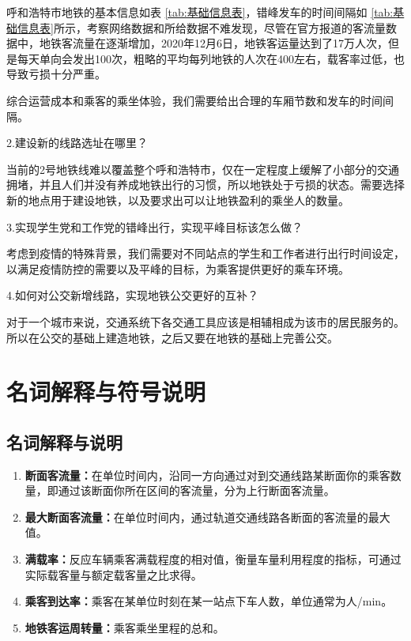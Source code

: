 \documentclass[12pt,a4paper]{mcmthesis}
\newcommand\wordc[1]{\textbf{#1}}
\begin{document}
    呼和浩特市地铁的基本信息如表 \ref{tab:基础信息表}，错峰发车的时间间隔如 \ref{tab:基础信息表}所示，考察网络数据和所给数据不难发现，尽管在官方报道的客流量数据中，地铁客流量在逐渐增加，2020年12月6日，地铁客运量达到了17万人次，但是每天单向会发出100次，粗略的平均每列地铁的人次在400左右，载客率过低，也导致亏损十分严重。

    综合运营成本和乘客的乘坐体验，我们需要给出合理的车厢节数和发车的时间间隔。

    2.建设新的线路选址在哪里？

    当前的2号地铁线难以覆盖整个呼和浩特市，仅在一定程度上缓解了小部分的交通拥堵，并且人们并没有养成地铁出行的习惯，所以地铁处于亏损的状态。需要选择新的地点用于建设地铁，以及要求出可以让地铁盈利的乘坐人的数量。

    3.实现学生党和工作党的错峰出行，实现平峰目标该怎么做？

    考虑到疫情的特殊背景，我们需要对不同站点的学生和工作者进行出行时间设定，以满足疫情防控的需要以及平峰的目标，为乘客提供更好的乘车环境。\cite{错峰出行}

    4.如何对公交新增线路，实现地铁公交更好的互补？

    对于一个城市来说，交通系统下各交通工具应该是相辅相成为该市的居民服务的。所以在公交的基础上建造地铁，之后又要在地铁的基础上完善公交。


    \section{名词解释与符号说明}

    \subsection{名词解释与说明}
    \begin{enumerate}
        \item \wordc{断面客流量：}在单位时间内，沿同一方向通过对到交通线路某断面你的乘客数量，即通过该断面你所在区间的客流量，分为上行断面客流量。
        \item \wordc{最大断面客流量：}在单位时间内，通过轨道交通线路各断面的客流量的最大值。
        \item \wordc{满载率：}反应车辆乘客满载程度的相对值，衡量车量利用程度的指标，可通过实际载客量与额定载客量之比求得。
        \item \wordc{乘客到达率：}乘客在某单位时刻在某一站点下车人数，单位通常为人/min。
        \item \wordc{地铁客运周转量：}乘客乘坐里程的总和。
    \end{enumerate}
\end{document}
